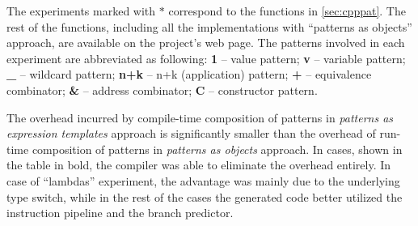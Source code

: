 %

The experiments marked with $*$ correspond to the 
functions in \textsection\ref{sec:cpppat}. The rest of the functions, 
including all the implementations with ``patterns as objects'' approach, are 
available on the project's web page. The patterns involved in each experiment are abbreviated as following:
{\bf 1}   -- value pattern;
{\bf v}   -- variable pattern;
{\bf \_}  -- wildcard pattern;
{\bf n+k} -- n+k (application) pattern;
{\bf +}   -- equivalence combinator;
{\bf \&}  -- address combinator;
{\bf C}   -- constructor pattern.


The overhead incurred by compile-time composition of 
patterns in \emph{patterns as expression templates} approach is significantly 
smaller than the overhead of run-time composition of patterns in \emph{patterns 
as objects} approach. In cases, shown in the table in bold, the compiler was 
able to eliminate the overhead entirely. In case of ``lambdas'' experiment, the 
advantage was mainly due 
to the underlying type switch, while in the rest of the cases the generated code
better utilized the instruction pipeline and the branch predictor.

